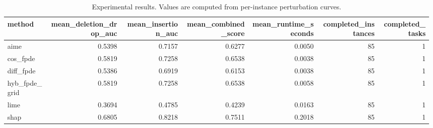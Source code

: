 \begin{table}[t]
\caption{Experimental results. Values are computed from per-instance perturbation curves.}
\label{tab:main_results_computed}
\centering
\begin{tabular}{lrrrrrr}
\toprule
method & mean\_deletion\_drop\_auc & mean\_insertion\_auc & mean\_combined\_score & mean\_runtime\_seconds & completed\_instances & completed\_tasks \\
\midrule
aime & 0.5398 & 0.7157 & 0.6277 & 0.0050 & 85 & 1 \\
cos\_fpde & 0.5819 & 0.7258 & 0.6538 & 0.0038 & 85 & 1 \\
diff\_fpde & 0.5386 & 0.6919 & 0.6153 & 0.0038 & 85 & 1 \\
hyb\_fpde\_grid & 0.5819 & 0.7258 & 0.6538 & 0.0058 & 85 & 1 \\
lime & 0.3694 & 0.4785 & 0.4239 & 0.0163 & 85 & 1 \\
shap & 0.6805 & 0.8218 & 0.7511 & 0.2018 & 85 & 1 \\
\bottomrule
\end{tabular}

\end{table}
